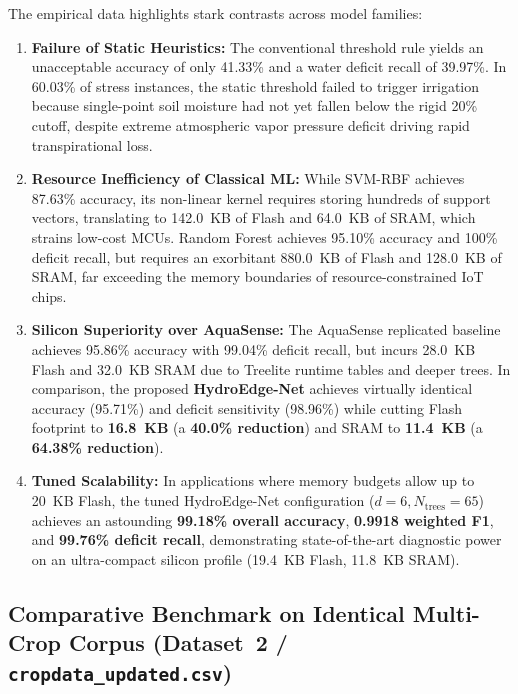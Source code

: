 The empirical data highlights stark contrasts across model families:
\begin{enumerate}
    \item \textbf{Failure of Static Heuristics:} The conventional threshold rule yields an unacceptable accuracy of only 41.33\% and a water deficit recall of 39.97\%. In 60.03\% of stress instances, the static threshold failed to trigger irrigation because single-point soil moisture had not yet fallen below the rigid 20\% cutoff, despite extreme atmospheric vapor pressure deficit driving rapid transpirational loss.
    \item \textbf{Resource Inefficiency of Classical ML:} While SVM-RBF achieves 87.63\% accuracy, its non-linear kernel requires storing hundreds of support vectors, translating to 142.0~KB of Flash and 64.0~KB of SRAM, which strains low-cost MCUs. Random Forest achieves 95.10\% accuracy and 100\% deficit recall, but requires an exorbitant 880.0~KB of Flash and 128.0~KB of SRAM, far exceeding the memory boundaries of resource-constrained IoT chips.
    \item \textbf{Silicon Superiority over AquaSense:} The AquaSense replicated baseline achieves 95.86\% accuracy with 99.04\% deficit recall, but incurs 28.0~KB Flash and 32.0~KB SRAM due to Treelite runtime tables and deeper trees. In comparison, the proposed \textbf{HydroEdge-Net} achieves virtually identical accuracy (95.71\%) and deficit sensitivity (98.96\%) while cutting Flash footprint to \textbf{16.8~KB} (a \textbf{40.0\% reduction}) and SRAM to \textbf{11.4~KB} (a \textbf{64.38\% reduction}).
    \item \textbf{Tuned Scalability:} In applications where memory budgets allow up to 20~KB Flash, the tuned HydroEdge-Net configuration ($d=6, N_{\text{trees}}=65$) achieves an astounding \textbf{99.18\% overall accuracy}, \textbf{0.9918 weighted F1}, and \textbf{99.76\% deficit recall}, demonstrating state-of-the-art diagnostic power on an ultra-compact silicon profile (19.4~KB Flash, 11.8~KB SRAM).
\end{enumerate}

\subsection{Comparative Benchmark on Identical Multi-Crop Corpus (Dataset~2 / \texttt{cropdata\_updated.csv})}
\label{subsec:identical_dataset_benchmark}

